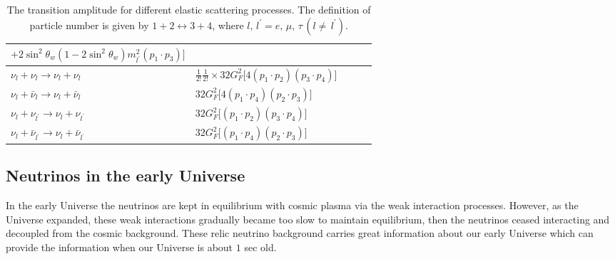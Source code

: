\begin{table}[h]
\begin{tabular}{lp{8cm}lp{8cm}l}
   $+2\sin^2\theta_w\left(1-2\sin^2\theta_w\right)m^2_{l^\prime}\left(p_1\cdot p_3\right)\bigg]$ \\
\hline
$\nu_l+\nu_l\longrightarrow\nu_l+\nu_l$ &
$\frac{1}{2!}\frac{1}{2!}\times32G^2_F\bigg[4\left(p_1\cdot p_2\right)\left(p_3\cdot p_4\right)\bigg]$ \\
\hline
$\nu_l+\bar{\nu}_l\longrightarrow\nu_l+\bar{\nu}_l$ &
$32G^2_F\bigg[4\left(p_1\cdot p_4\right)\left(p_2\cdot p_3\right)\bigg]$ \\
\hline
$\nu_l+\nu_{l^\prime}\longrightarrow\nu_l+\nu_{l^\prime}$ &
$32G^2_F\bigg[\left(p_1\cdot p_2\right)\left(p_3\cdot p_4\right)\bigg]$ \\
\hline
$\nu_l+\bar{\nu}_{l^\prime}\longrightarrow\nu_l+\bar{\nu}_{l^\prime}$ &
$32G^2_F\bigg[\left(p_1\cdot p_4\right)\left(p_2\cdot p_3\right)\bigg]$ \\
\hline\hline
\end{tabular}
\caption{The transition amplitude for different elastic scattering processes. The definition of particle number is given by $1+2\leftrightarrow3+4$, where $l,\,l^\prime=e,\,\mu,\,\tau\,(l\neq\,l^\prime)$.}
\label{T006}
\end{table}

\clearpage


\subsection{Neutrinos in the early Universe }
In the early Universe the neutrinos are kept in equilibrium with cosmic plasma via the weak interaction processes. However, as the Universe expanded, these weak interactions gradually became too slow to maintain equilibrium, then the neutrinos ceased interacting and decoupled from the cosmic background. These relic neutrino background carries great information about our early Universe which can provide the information when our Universe is about $1$ sec old. 

